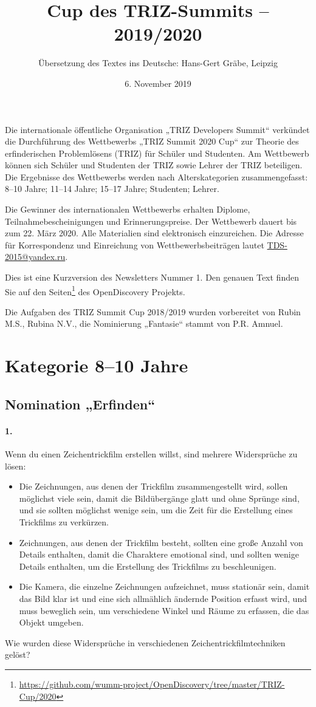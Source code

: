\documentclass[11pt,a4paper]{article}
\title{Cup des TRIZ-Summits – 2019/2020}
\author{Übersetzung des Textes ins Deutsche: Hans-Gert Gr\"abe, Leipzig}
\date{6. November 2019}
\newcommand{\credentials}{Die Aufgaben des TRIZ Summit Cup 2018/2019 wurden
  vorbereitet von Rubin M.S., Rubina N.V., die Nominierung „Fantasie“ stammt
  von P.R. Amnuel.}
\begin{document}
\maketitle

Die internationale öffentliche Organisation „TRIZ Developers Summit“ verkündet
die Durchführung des Wettbewerbs „TRIZ Summit 2020 Cup“ zur Theorie des
erfinderischen Problemlösens (TRIZ) für Schüler und Studenten. Am Wettbewerb
können sich Schüler und Studenten der TRIZ sowie Lehrer der TRIZ beteiligen.
Die Ergebnisse des Wettbewerbs werden nach Alterskategorien zusammengefasst:
8--10 Jahre; 11--14 Jahre; 15--17 Jahre; Studenten; Lehrer.

Die Gewinner des internationalen Wettbewerbs erhalten Diplome,
Teilnahmebescheinigungen und Erinnerungspreise. Der Wettbewerb dauert bis zum
22. März 2020. Alle Materialien sind elektronisch einzureichen. Die Adresse
für Korrespondenz und Einreichung von Wettbewerbsbeiträgen lautet
\url{TDS-2015@yandex.ru}.

Dies ist eine Kurzversion des Newsletters Nummer 1. Den genauen Text finden
Sie auf den
Seiten\footnote{\url{https://github.com/wumm-project/OpenDiscovery/tree/master/TRIZ-Cup/2020}}
des OpenDiscovery Projekts.

\credentials
\vfill
\tableofcontents
\vfill
\clearpage
\section{Kategorie 8--10 Jahre}

\subsection*{Nomination „Erfinden“}

\paragraph {1.}
Wenn du einen Zeichentrickfilm erstellen willst, sind mehrere Widersprüche zu
lösen:
\begin {itemize}
\item Die Zeichnungen, aus denen der Trickfilm zusammengestellt wird, sollen
  möglichst viele sein, damit die Bildübergänge glatt und ohne Sprünge sind,
  und sie sollten möglichst wenige sein, um die Zeit für die Erstellung eines
  Trickfilms zu verkürzen.
\item Zeichnungen, aus denen der Trickfilm besteht, sollten eine große Anzahl
  von Details enthalten, damit die Charaktere emotional sind, und sollten
  wenige Details enthalten, um die Erstellung des Trickfilms zu beschleunigen.
\item Die Kamera, die einzelne Zeichnungen aufzeichnet, muss stationär sein,
  damit das Bild klar ist und eine sich allmählich ändernde Position erfasst
  wird, und muss beweglich sein, um verschiedene Winkel und Räume zu erfassen,
  die das Objekt umgeben.
\end{itemize}
Wie wurden diese Widersprüche in verschiedenen Zeichentrickfilmtechniken
gelöst?
\end{document}
